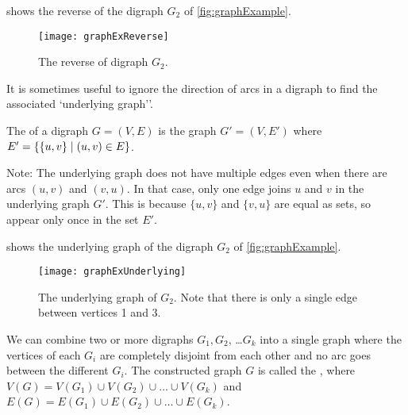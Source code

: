 \begin{Example}
 shows the reverse of the digraph $G_2$ of \cref{fig:graphExample}.
\end{Example}

\begin{figure}[h]
\centering
\texttt{[image: graphExReverse]}
\caption{The reverse of digraph $G_2$.}
\label{fig:reverse}
\end{figure}

It is sometimes useful to ignore the direction of arcs in a digraph to find the associated `underlying graph''.

\begin{Definition}
The  of a digraph $G = (V, E)$ is the graph 
$G' = (V, E')$ where $E' = \mbox{$\{\{u, v\} \mid (u, v)\in E\}$}$.
\end{Definition}


Note: The underlying graph does not have multiple edges even when there are arcs $(u, v)$ and $(v, u)$. 
In that case, only one edge joins $u$ and $v$ in the underlying graph $G'$.  
This is because $\{u, v\}$ and $\{v, u\}$ are equal as sets, so appear only once in the set $E'$.

\begin{Example}
 shows the underlying graph of the digraph $G_2$ of \cref{fig:graphExample}.
\end{Example}

\begin{figure}
\centering
\texttt{[image: graphExUnderlying]}
\caption{The underlying graph of $G_2$. Note that there is only a single edge between vertices 1 and 3.}
\label{fig:underly}
\end{figure}

\begin{Definition} 
We can combine two or more digraphs $G_1, G_2$, \ldots $G_k$ into a
single graph where the vertices of each $G_i$ are completely disjoint from
each other and no arc goes between the different $G_i$. The constructed
graph $G$ is called the , where $V(G) = V(G_1) \cup
V(G_2) \cup \ldots \cup V(G_k)$ and $E(G) = E(G_1) \cup E(G_2) \cup \ldots
\cup E(G_k)$.
\end{Definition}




